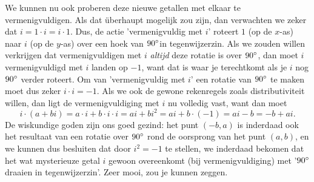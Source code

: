 \documentclass{ximera}
\begin{document}
\begin{image}[\textwidth]
	\end{image}

	\begin{xmuitweiding}\nl
	We kunnen nu ook proberen deze nieuwe getallen met elkaar te vermenigvuldigen. 
	Als dat überhaupt mogelijk zou zijn, dan verwachten we zeker dat $i = 1\cdot i = i\cdot1$. 
	Dus, de actie 'vermenigvuldig met $i$' roteert $1$ (op de $x$-as) naar $i$ (op de $y$-as) over een hoek van $90^\circ$in tegenwijzerzin.
	Als we zouden willen verkrijgen dat vermenigvuldigen met $i$ \textit{altijd} deze rotatie is over $90^\circ$, dan moet $i$ vermenigvuldigd met $i$ landen op $-1$, want dat is waar je terechtkomt als je $i$ nog $90^\circ$ verder roteert. Om van 'vermenigvuldig met $i$' een rotatie van $90^\circ$ te maken moet dus zeker $i\cdot i=-1$. 
	Als we ook de gewone rekenregels zoals distributiviteit willen, dan ligt de vermenigvuldiging met $i$ nu volledig vast, want dan moet
	$$
	i\cdot(a+bi) = a\cdot i + b\cdot i\cdot i = ai + bi^2 = ai + b\cdot(-1) = ai - b = -b + ai.
	$$
	De wiskundige goden zijn ons goed gezind: het punt $(-b,a)$ is inderdaad ook het resultaat van een rotatie over $90^\circ$ rond de oorsprong van het punt $(a,b)$, en we kunnen dus besluiten dat door $i^2=-1$ te stellen, we inderdaad bekomen dat het wat mysterieuze getal $i$ gewoon overeenkomt (bij vermenigvuldiging) met '$90^\circ$ draaien in tegenwijzerzin'. Zeer mooi, zou je kunnen zeggen.
	\end{xmuitweiding}
\end{document}
